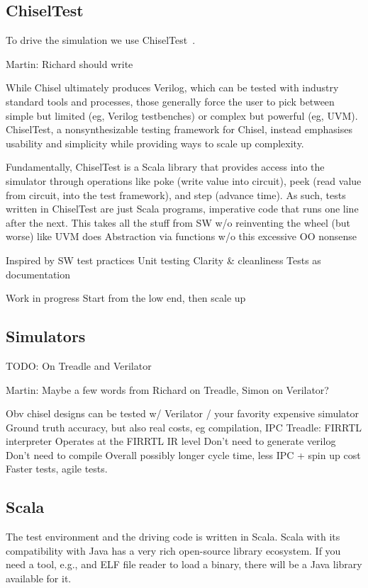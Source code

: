 \documentclass[conference]{IEEEtran}
\newcommand{\todo}[1]{{\color{olive} TODO: #1}}
\newcommand{\martin}[1]{{\color{blue} Martin: #1}}
\begin{document}
\subsection{ChiselTest}

To drive the simulation we use ChiselTest~\cite{chisel:tester2}.

\martin{Richard should write}

While Chisel ultimately produces Verilog, which can be tested with industry standard tools and processes, those generally force the user to pick between simple but limited (eg, Verilog testbenches) or complex but powerful (eg, UVM).
ChiselTest, a nonsynthesizable testing framework for Chisel, instead emphasises usability and simplicity while providing ways to scale up complexity.

Fundamentally, ChiselTest is a Scala library that provides access into the simulator through operations like poke (write value into circuit), peek (read value from circuit, into the test framework), and step (advance time).
As such, tests written in ChiselTest are just Scala programs, imperative code that runs one line after the next.
This takes all the stuff from SW w/o reinventing the wheel (but worse) like UVM does
Abstraction via functions w/o this excessive OO nonsense

Inspired by SW test practices
Unit testing
Clarity & cleanliness
Tests as documentation

Work in progress
Start from the low end, then scale up


\subsection{Simulators}

\todo{On Treadle and Verilator}

\martin{Maybe a few words from Richard on Treadle, Simon on Verilator?}

Obv chisel designs can be tested w/ Verilator / your favority expensive simulator
Ground truth accuracy, but also real costs, eg compilation, IPC
Treadle: FIRRTL interpreter
Operates at the FIRRTL IR level
Don't need to generate verilog
Don't need to compile
Overall possibly longer cycle time, less IPC + spin up cost
Faster tests, agile tests.


\subsection{Scala}

The test environment and the driving code is written in Scala. Scala with its
compatibility with Java has a very rich open-source library ecosystem.
If you need a tool, e.g., and ELF file reader to load a binary, there will be a Java
library available for it.
\end{document}
